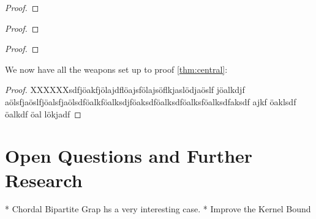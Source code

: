 \begin{lemma}
    
\end{lemma}
\begin{proof} 
\end{proof}

\begin{lemma}
    
\end{lemma}
\begin{proof} 
\end{proof}


\begin{lemma}
    
\end{lemma}
\begin{proof} 
\end{proof}

We now have all the weapons set up to proof \cref{thm:central}: 

\centraltheo*
\begin{proof}
    XXXXXXsdfjöakfjölajdflöajsfölajsöflkjaslödjaöslf jöalkdjf aölsfjaöslfjöalsfjaölsdföalkföalksdjföaksdföalksdföalksföalksdfaksdf ajkf öaklsdf öalkdf öal    lökjadf
\end{proof}

\chapter{Open Questions and Further Research}

* Chordal Bipartite Grap hs a very interesting case.
* Improve the Kernel Bound